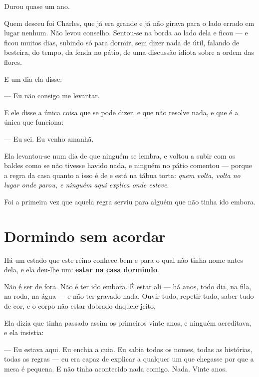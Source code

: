 \documentclass[livro.tex]{subfiles}
\begin{document}
Durou quase um ano.

\medskip

Quem desceu foi Charles, que já era grande e já não girava para o lado errado em lugar nenhum.
Não levou conselho. Sentou-se na borda ao lado dela e ficou --- e ficou muitos dias, subindo só
para dormir, sem dizer nada de útil, falando de besteira, do tempo, da fenda no pátio, de uma
discussão idiota sobre a ordem das flores.

E um dia ela disse:

--- Eu não consigo me levantar.

E ele disse a única coisa que se pode dizer, e que não resolve nada, e que é a única que
funciona:

--- Eu sei. Eu venho amanhã.

\medskip

Ela levantou-se num dia de que ninguém se lembra, e voltou a subir com os baldes como se não
tivesse havido nada, e ninguém no pátio comentou --- porque a regra da casa quanto a isso é de
\Ven e está na tábua torta: \emph{quem volta, volta no lugar onde parou, e ninguém aqui explica
onde esteve}.

Foi a primeira vez que aquela regra serviu para alguém que não tinha ido embora.

\section{Dormindo sem acordar}

Há um estado que este reino conhece bem e para o qual não tinha nome antes dela, e ela deu-lhe
um: \textbf{estar na casa dormindo}.

Não é ser de fora. Não é ter ido embora. É estar ali --- há anos, todo dia, na fila, na roda, na
água --- e não ter gravado nada. Ouvir tudo, repetir tudo, saber tudo de cor, e o corpo não estar
dobrado daquele jeito.

\medskip

Ela dizia que tinha passado assim os primeiros vinte anos, e ninguém acreditava, e ela insistia:

--- Eu estava aqui. Eu enchia a cuia. Eu sabia todos os nomes, todas as histórias, todas as
regras --- eu era capaz de explicar a qualquer um que chegasse por que a mesa é pequena. E não
tinha acontecido nada comigo. Nada. Vinte anos.
\end{document}

